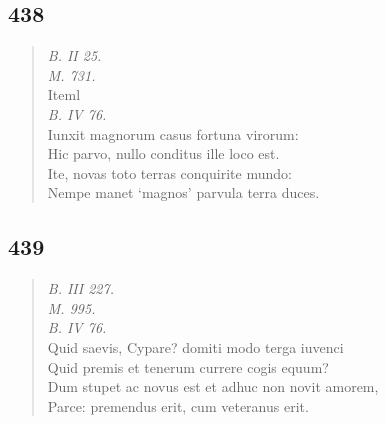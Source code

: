 \documentclass[11pt, a4paper]{report}
\begin{document}
            \subsection*{438}
      \begin{verse}
      \textit{B. II 25.} \\ \textit{M. 731.} \\ Iteml \\ \textit{B. IV 76.} \\ Iunxit magnorum casus fortuna virorum: \\ Hic parvo, nullo conditus ille loco est. \\ Ite, novas toto terras conquirite mundo: \\ Nempe manet ‘magnos’ parvula terra duces. \\ 
      \end{verse}
  
            \subsection*{439}
      \begin{verse}
      \textit{B. III 227.} \\ \textit{M. 995.} \\ \textit{B. IV 76.} \\ Quid saevis, Cypare? domiti modo terga iuvenci \\ Quid premis et tenerum currere cogis equum? \\ Dum stupet ac novus est et adhuc non novit amorem, \\ Parce: premendus erit, cum veteranus erit. \\ 
      \end{verse}
  
\end{document}
